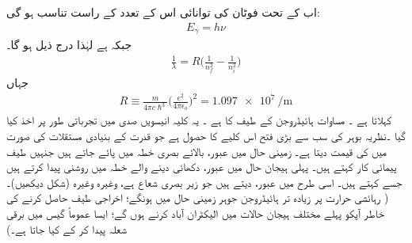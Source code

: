 اب   کے تحت  فوٹان  کی توانائی اس کے تعدد کے راست تناسب ہو گی:
\begin{align}
E_{\gamma}=h\nu
\end{align}
جبکہ        ہے لہٰذا درج ذیل ہو گا۔
\begin{align}\label{مساوات_تین_ابعادی_رڈبرگ_کلیہ}
\frac{1}{\lambda}=R\big(\frac{1}{n^{2}_{f}}-\frac{1}{n^{2}_{i}}\big)
\end{align}
جہاں 
\begin{align}
R\equiv \frac{m}{4\pi{c}\hslash^{3}}\big(\frac{e^{2}}{4\pi\epsilon_{o}}\big)^{2}=\SI{1.097e7}{\per\meter}
\end{align}
 کہلاتا ہے ۔ مساوات  ہائیڈروجن کے طیف کا    ہے ۔ یہ کلیہ انیسویں  صدی میں تجرباتی طور پر اخذ کیا گیا ۔نظریہ بوہر  کی سب سے بڑی فتح  اس کلیے کا حصول ہے جو قدرت کے بنیادی مستقلات  کی صورت میں   کی قیمت دیتا ہے۔ زمینی حال    میں عبور،   بالائے بصری خطہ میں پائے  جاتے  ہیں  جنہیں    طیف پیمائی کار   کہتے ہیں۔ پہلی  ہیجان  حال  
میں عبور،     دکھائی دینے والے خطہ میں  روشنی پیدا  کرتے  ہیں  جسے   کہتے ہیں۔  اسی طرح   
میں  عبور،   دیتے ہیں  جو  زیر  بصری شعاع ہے، وغیرہ وغیرہ  (شکل        دیکھیں)۔  (  رہائشی حرارت پر زیادہ تر  ہائیڈروجن  جوہر زمینی حال میں ہونگے؛ اخراجی طیف حاصل کرنے کی خاطر آپکو پہلے مختلف  ہیجان  حالات میں الیکٹران  آباد کرنے ہوں گے؛  ایسا عموماً گیس میں برقی شعلہ   پیدا کر کے کیا جاتا ہے۔)


